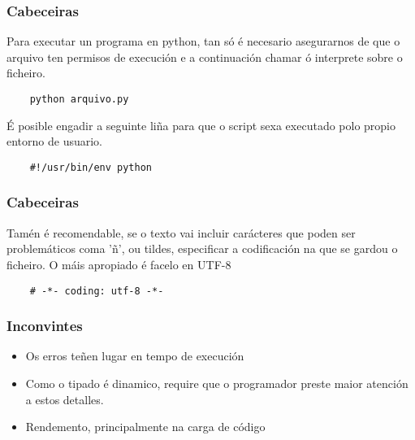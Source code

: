 \begin{frame}[fragile]
  \frametitle{Cabeceiras}
  Para executar un programa en python, tan só é necesario asegurarnos de que o
  arquivo ten permisos de execución e a continuación chamar ó interprete sobre o
  ficheiro.
  \small
  \begin{verbatim}
    python arquivo.py
  \end{verbatim}
  \normalsize
  É posible engadir a seguinte liña para que o script sexa executado polo propio
  entorno de usuario.
  \small
  \begin{verbatim}
    #!/usr/bin/env python 
  \end{verbatim}
  \normalsize
\end{frame}

\begin{frame}[fragile]
  \frametitle{Cabeceiras}
    Tamén é recomendable, se o texto vai incluir carácteres que poden ser
    problemáticos coma 'ñ', ou tildes, especificar a codificación na que se gardou
    o ficheiro. O máis apropiado é facelo en UTF-8
\begin{verbatim}
    # -*- coding: utf-8 -*-
\end{verbatim}
    \normalsize
\end{frame}

\begin{frame}
  \frametitle{Inconvintes}
  \begin{itemize}
  \item Os erros teñen lugar en tempo de execución
  \item Como o tipado é dinamico, require que o programador preste maior
    atención a estos detalles.
  \item Rendemento, principalmente na carga de código
  \end{itemize}
\end{frame}
